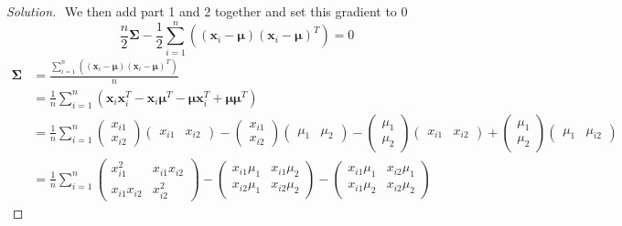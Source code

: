 \documentclass{article}
\newenvironment{solution}
  {\renewcommand\qedsymbol{$\blacksquare$}\begin{proof}[Solution]$ $}
  {\end{proof}}
\newcommand{\vect}[1]{\boldsymbol{#1}}
\begin{document}
\begin{Exercise}
\begin{solution}
        We then add part 1 and 2 together and set this gradient to 0
        \[
            \frac{n}{2}\vect{\Sigma} - \frac{1}{2} \sum_{i=1}^n ((\vect{x}_i-\vect{\mu})(\vect{x}_i -\vect \mu)^T) = 0
        \]
        \begin{align*}
            \vect{\Sigma} & = \frac{\sum_{i=1}^n ((\vect{x}_i-\vect{\mu})(\vect{x}_i -\vect \mu)^T)}{n}                                               \\
                          & = \frac{1}{n}\sum_{i=1}^n (\vect x_i \vect x_i^T - \vect x_i \vect \mu^T - \vect \mu \vect x_i^T + \vect \mu \vect \mu^T) \\
                          & = \frac{1}{n} \sum_{i=1}^{n}
            \begin{pmatrix}x_{i1} \\ x_{i2}\end{pmatrix}\begin{pmatrix}x_{i1} & x_{i2}\end{pmatrix}
            - \begin{pmatrix}x_{i1} \\ x_{i2}\end{pmatrix}\begin{pmatrix}\mu_{1} & \mu_{2}\end{pmatrix}
            - \begin{pmatrix}\mu_{1} \\ \mu_{2}\end{pmatrix}\begin{pmatrix}x_{i1} & x_{i2}\end{pmatrix}
            + \begin{pmatrix}\mu_{1} \\ \mu_{2}\end{pmatrix}\begin{pmatrix}\mu_{1} & \mu_{i2}\end{pmatrix}                                            \\
                          & = \frac{1}{n} \sum_{i=1}^{n}
            \begin{pmatrix}x_{i1}^2 & x_{i1}x_{i2} \\ x_{i1} x_{i2} & x_{i2}^2\end{pmatrix}
            - \begin{pmatrix}x_{i1}\mu_{1} & x_{i1}\mu_{2} \\ x_{i2} \mu_1 & x_{i2} \mu_2\end{pmatrix}
            - \begin{pmatrix}x_{i1}\mu_{1} & x_{i2}\mu_{1} \\ x_{i1} \mu_2 & x_{i2} \mu_2\end{pmatrix}

\end{align*}
\end{solution}
\end{Exercise}
\end{document}
